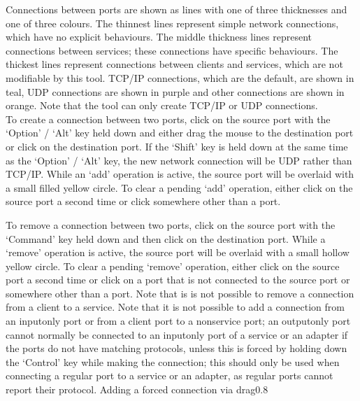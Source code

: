 Connections between ports are shown as lines with one of three thicknesses and one of
three colours.
The thinnest lines represent simple \yarp{} network connections, which have no explicit
behaviours.
The middle thickness lines represent connections between  services; these
connections have specific behaviours.
The thickest lines represent connections between clients and services, which are not
modifiable by this tool.
TCP/IP connections, which are the default, are shown in teal, UDP connections are shown in
purple and other connections are shown in orange.
Note that the tool can only create TCP/IP or UDP connections.\\

To create a connection between two ports, click on the source port with the `Option' /
`Alt' key held down and either drag the mouse to the destination port or click on the
destination port.
If the `Shift' key is held down at the same time as the `Option' / `Alt' key, the new
network connection will be UDP rather than TCP/IP.
While an `add' operation is active, the source port will be overlaid with a small filled
yellow circle.
To clear a pending `add' operation, either click on the source port a second time or click
somewhere other than a port.
\condPage
{}

\condPage
{}

To remove a connection between two ports, click on the source port with the `Command' key
held down and then click on the destination port.
While a `remove' operation is active, the source port will be overlaid with a small
hollow yellow circle.
To clear a pending `remove' operation, either click on the source port a second time or
click on a port that is not connected to the source port or somewhere other than a port.
Note that is is not possible to remove a connection from a client to a service.
\condPage{}
Note that it is not possible to add a connection from an input\longDash{}only port or from
a client port to a non\longDash{}service port; an output\longDash{}only port cannot
normally be connected to an input\longDash{}only port of a service or an adapter if the
ports do not have matching protocols, unless this is forced by holding down the `Control'
key while making the connection; this should only be used when connecting a regular
\yarp{} port to a service or an adapter, as regular \yarp{} ports cannot report their
protocol.
%
{Adding a forced connection via drag}{0.8}

